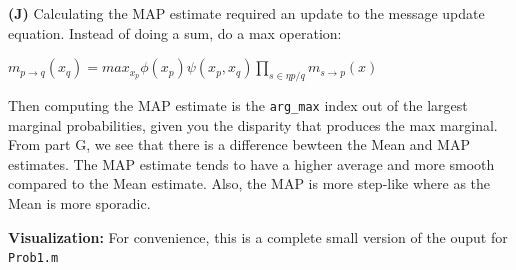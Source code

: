 \documentclass[12pt,twoside]{article}
\begin{document}
\textbf{(J)} Calculating the MAP estimate required an update to the message update equation.  Instead of doing a sum, do a max operation:  
\newline

\begin{center}
$m_{p \to q}(x_q) = max_{x_p} \phi(x_p) \psi(x_p, x_q) \prod\limits_{s \in \eta{p}/q} m_{s \to p}(x)$
\end{center}

Then computing the MAP estimate is the \texttt{arg\_max} index out of the largest marginal probabilities, given you the disparity that produces the max marginal.  From part G, we see that there is a difference bewteen the Mean and MAP estimates.  The MAP estimate tends to have a higher average and more smooth compared to the Mean estimate.  Also, the MAP is more step-like where as the Mean is more sporadic.
\newline

\textbf{Visualization:} For convenience, this is a complete small version of the ouput for \texttt{Prob1.m}
\newline
\end{document}
